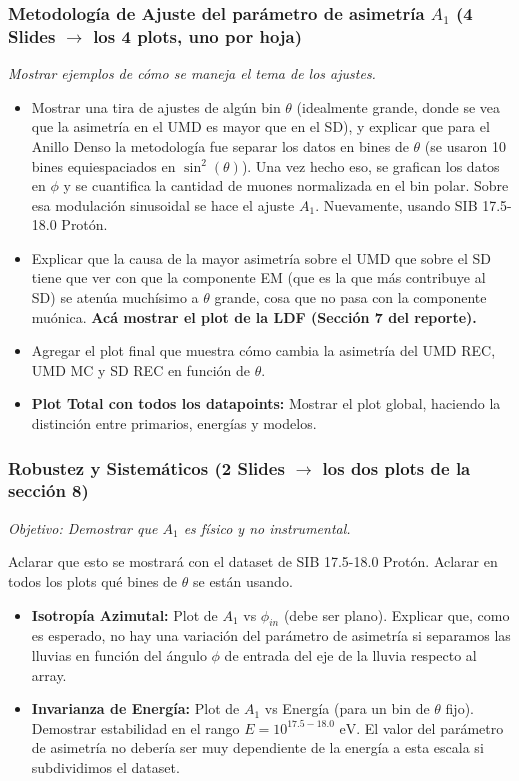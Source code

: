 \subsubsection{Metodología de Ajuste del parámetro de asimetría $A_1$ (4 Slides $\rightarrow$ los 4 plots, uno por hoja)}
\textit{Mostrar ejemplos de cómo se maneja el tema de los ajustes.}
\begin{itemize}
	\item Mostrar una tira de ajustes de algún bin $\theta$ (idealmente grande, donde se vea que la asimetría en el UMD es mayor que en el SD), y explicar que para el Anillo Denso la metodología fue separar los datos en bines de $\theta$ (se usaron 10 bines equiespaciados en $\sin^2(\theta)$). Una vez hecho eso, se grafican los datos en $\phi$ y se cuantifica la cantidad de muones normalizada en el bin polar. Sobre esa modulación sinusoidal se hace el ajuste $A_1$. Nuevamente, usando SIB 17.5-18.0 Protón.
	\item Explicar que la causa de la mayor asimetría sobre el UMD que sobre el SD tiene que ver con que la componente EM (que es la que más contribuye al SD) se atenúa muchísimo a $\theta$ grande, cosa que no pasa con la componente muónica. \textbf{Acá mostrar el plot de la LDF (Sección 7 del reporte).}
	\item Agregar el plot final que muestra cómo cambia la asimetría del UMD REC, UMD MC y SD REC en función de $\theta$.
	\item \textbf{Plot Total con todos los datapoints:} Mostrar el plot global, haciendo la distinción entre primarios, energías y modelos.
\end{itemize}

\subsubsection{Robustez y Sistemáticos (2 Slides $\rightarrow$ los dos plots de la sección 8)}
\textit{Objetivo: Demostrar que $A_1$ es físico y no instrumental.}

Aclarar que esto se mostrará con el dataset de SIB 17.5-18.0 Protón. Aclarar en todos los plots qué bines de $\theta$ se están usando.
\begin{itemize}
	\item \textbf{Isotropía Azimutal:} Plot de $A_1$ vs $\phi_{in}$ (debe ser plano). Explicar que, como es esperado, no hay una variación del parámetro de asimetría si separamos las lluvias en función del ángulo $\phi$ de entrada del eje de la lluvia respecto al array. 
	\item \textbf{Invarianza de Energía:} Plot de $A_1$ vs Energía (para un bin de $\theta$ fijo). Demostrar estabilidad en el rango $E = 10^{17.5 - 18.0} \text{ eV}$. El valor del parámetro de asimetría no debería ser muy dependiente de la energía a esta escala si subdividimos el dataset.
\end{itemize}


